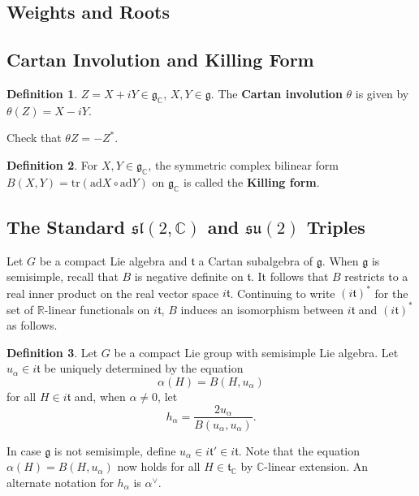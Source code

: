\documentclass{article}
\theoremstyle{definition}
\newtheorem{definition}{Definition}[section]
\theoremstyle{plain}
\begin{document}
\subsection{Weights and Roots}

\subsection{Cartan Involution and Killing Form}

\begin{definition}
    $ Z=X+iY\in \mathfrak{g}_{\mathbb{C} } $, $ X,Y\in \mathfrak{g} $. The \textbf{Cartan involution} $ \theta $ is given by $ \theta(Z)=X-iY $.
\end{definition}

Check that $ \theta Z=-Z^* $.

\begin{definition}
    For $ X,Y\in \mathfrak{g}_{\mathbb{C} } $, the symmetric complex bilinear form $ B(X,Y)=\text{tr}(\text{ad}X\circ \text{ad}Y) $ on $ \mathfrak{g}_{\mathbb{C} } $ is called the \textbf{Killing form}.
\end{definition}

\subsection{The Standard $ \mathfrak{sl}(2,\mathbb{C} ) $ and $ \mathfrak{su}(2) $ Triples}

Let $ G $ be a compact Lie algebra and $ \mathfrak{t} $ a Cartan subalgebra of $ \mathfrak{g} $. When $ \mathfrak{g} $ is semisimple, recall that $ B $ is negative definite on $ \mathfrak{t} $. It follows that $ B $ restricts to a real inner product on the real vector space $ i\mathfrak{t} $. Continuing to write $ (i\mathfrak{t})^* $ for the set of $ \mathbb{R} $-linear functionals on $ i\mathfrak{t} $, $ B $ induces an isomorphism between $ i\mathfrak{t} $ and $ (i\mathfrak{t})^* $ as follows.

\begin{definition}
    Let $ G $ be a compact Lie group with semisimple Lie algebra. Let $ u_{\alpha}\in i\mathfrak{t} $ be uniquely determined by the equation\[
        \alpha(H)=B(H,u_{\alpha})
    \]for all $ H\in i\mathfrak{t} $ and, when $ \alpha\neq 0 $, let\[
        h_{\alpha}=\frac{2u_{\alpha}}{B(u_{\alpha},u_{\alpha})}.
    \]
\end{definition}

In case $ \mathfrak{g} $ is not semisimple, define $ u_{\alpha}\in i\mathfrak{t}'\in i\mathfrak{t} $. Note that the equation $ \alpha(H)=B(H,u_{\alpha}) $ now holds for all $ H\in \mathfrak{t}_{\mathbb{C} } $ by $ \mathbb{C}  $-linear extension. An alternate notation for $ h_{\alpha} $ is $ \alpha^{\vee} $.
\end{document}
